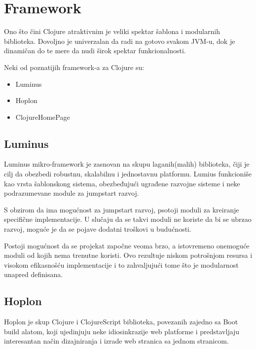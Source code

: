 \section{Framework}
\label{sec:framework}
Ono što čini Clojure atraktivnim je veliki spektar šablona i modularnih biblioteka. Dovoljno je univerzalan da radi na gotovo svakom JVM-u, dok je dinamičan do te mere da nudi širok spektar funkcionalnosti.


Neki od poznatijih framework-a za Clojure su:\cite{frameworks}

\begin{itemize}
            \item Luminus
            \item Hoplon
            \item ClojureHomePage
\end{itemize}

\subsection{Luminus}
\label{subsec:luminus}
Luminus mikro-framework je zasnovan na skupu laganih(malih) biblioteka, čiji je cilj da obezbedi robustnu, skalabilnu i jednostavnu platformu. Lumius funkcioniše kao vrsta šablonskong sistema, obezbeđujući ugrađene razvojne sisteme i neke
podrazumevane module za jumpstart razvoj.\cite{luminus}


S obzirom da ima mogućnost za jumpstart razvoj, psotoji moduli za kreiranje specifične implementacije. U slučaju
da se takvi moduli ne koriste da bi se ubrzao razvoj, moguće je da se pojave dodatni troškovi u budućnosti.

Postoji mogućnost da se projekat započne veoma brzo, a istovremeno onemoguće moduli od kojih nema trenutne koristi. Ovo rezultuje niskom potrošnjom resursa i visokom efikasnošću implementacije i to zahvaljujući tome što je modularnost unapred definisana.\cite{frameworks}

\subsection{Hoplon}
\label{subsec:hoplon}
Hoplon je skup Clojure i ClojureScript biblioteka, povezanih zajedno sa Boot build alatom, koji ujedinjuju neke idiosinkrazije web platforme i predstavljaju interesantan način dizajniranja i izrade web stranica sa jednom stranicom.\cite{hoplon}


